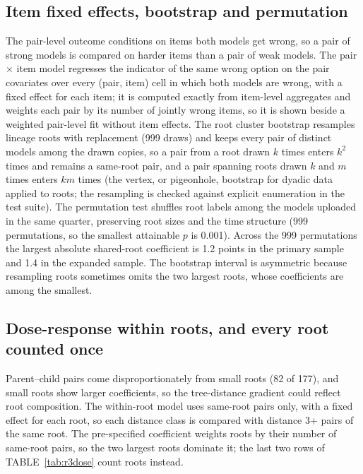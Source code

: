 \documentclass[10pt]{article}
\begin{document}
\subsection*{Item fixed effects, bootstrap and permutation}
The pair-level outcome conditions on items both models get wrong, so a pair of strong models is compared on harder items than a pair of weak models. The pair $\times$ item model regresses the indicator of the same wrong option on the pair covariates over every (pair, item) cell in which both models are wrong, with a fixed effect for each item; it is computed exactly from item-level aggregates and weights each pair by its number of jointly wrong items, so it is shown beside a weighted pair-level fit without item effects. The root cluster bootstrap resamples lineage roots with replacement (999 draws) and keeps every pair of distinct models among the drawn copies, so a pair from a root drawn $k$ times enters $k^2$ times and remains a same-root pair, and a pair spanning roots drawn $k$ and $m$ times enters $km$ times (the vertex, or pigeonhole, bootstrap for dyadic data applied to roots; the resampling is checked against explicit enumeration in the test suite). The permutation test shuffles root labels among the models uploaded in the same quarter, preserving root sizes and the time structure (999 permutations, so the smallest attainable $p$ is 0.001). Across the 999 permutations the largest absolute shared-root coefficient is 1.2 points in the primary sample and 1.4 in the expanded sample. The bootstrap interval is asymmetric because resampling roots sometimes omits the two largest roots, whose coefficients are among the smallest.

\begin{table}[H]
\caption{\textbf{Item fixed effects and resampling inference} (post hoc; 95\% CIs).}
\label{tab:r3inf}
\centering
\footnotesize
\setlength{\tabcolsep}{2.5pt}
\end{table}

\subsection*{Dose-response within roots, and every root counted once}
Parent--child pairs come disproportionately from small roots (82 of 177), and small roots show larger coefficients, so the tree-distance gradient could reflect root composition. The within-root model uses same-root pairs only, with a fixed effect for each root, so each distance class is compared with distance 3+ pairs of the same root. The pre-specified coefficient weights roots by their number of same-root pairs, so the two largest roots dominate it; the last two rows of TABLE~\ref{tab:r3dose} count roots instead.
\end{document}
